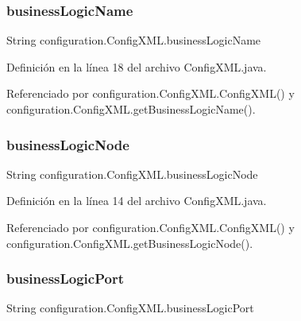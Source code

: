 \subsubsection{\texorpdfstring{businessLogicName}{businessLogicName}}
{\footnotesize\ttfamily String configuration.\+Config\+X\+M\+L.\+business\+Logic\+Name\hspace{0.3cm}{\ttfamily [private]}}



Definición en la línea 18 del archivo Config\+X\+M\+L.\+java.



Referenciado por configuration.\+Config\+X\+M\+L.\+Config\+X\+M\+L() y configuration.\+Config\+X\+M\+L.\+get\+Business\+Logic\+Name().

\mbox{\label{classconfiguration_1_1_config_x_m_l_a8eaef059e5c5b7dc23331ba72c04eb59}} 
\subsubsection{\texorpdfstring{businessLogicNode}{businessLogicNode}}
{\footnotesize\ttfamily String configuration.\+Config\+X\+M\+L.\+business\+Logic\+Node\hspace{0.3cm}{\ttfamily [private]}}



Definición en la línea 14 del archivo Config\+X\+M\+L.\+java.



Referenciado por configuration.\+Config\+X\+M\+L.\+Config\+X\+M\+L() y configuration.\+Config\+X\+M\+L.\+get\+Business\+Logic\+Node().

\mbox{\label{classconfiguration_1_1_config_x_m_l_ac679ff78a18d6f012cb613d8e8c7ac41}} 
\subsubsection{\texorpdfstring{businessLogicPort}{businessLogicPort}}
{\footnotesize\ttfamily String configuration.\+Config\+X\+M\+L.\+business\+Logic\+Port\hspace{0.3cm}{\ttfamily [private]}}



